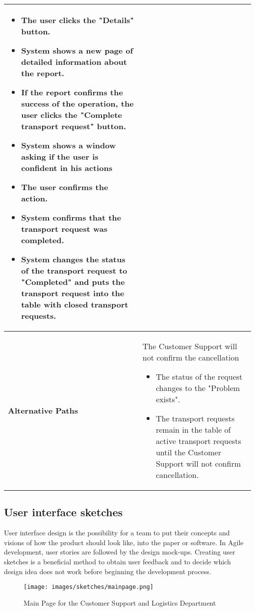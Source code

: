 \documentclass[a4paper]{article}
\begin{document}
\begin{longtable}{|p{}|p{}|}
\begin{itemize}
             \item The user clicks the "Details" button.
             \item System shows a new page of detailed information about the report.
             \item If the report confirms the success of the operation, the user clicks the "Complete transport request" button.
             \item System shows a window asking if the user is confident in his actions
             \item The user confirms the action.
             \item System confirms that the transport request was completed.
             \item System changes the status of the transport request to "Completed" and puts the transport request into the table with closed transport requests.
         \end{itemize} \\
         
      \hline
    \textbf{Alternative Paths} & The Customer Support will not confirm the cancellation
        \begin{itemize}
            \item The status of the request changes to the "Problem exists".
            \item The transport requests remain in the table of active transport requests until the Customer Support will not confirm cancellation.
        \end{itemize} 
        \\
        \hline
    \end{longtable}
    

    \subsection{User interface sketches}
   
    User interface design is the possibility for a team to put their concepts and visions of how the product should look like, into the paper or software. In Agile development, user stories are followed by the design mock-ups. Creating user sketches is a beneficial method to obtain user feedback and to decide which design idea does not work before beginning the development process.
    
     \begin{figure}[H]
     \centering
     \texttt{[image: images/sketches/mainpage.png]}
     \caption{Main Page for the Customer Support and Logistics Department}
     \label{mainPage}
    \end{figure}
    
\end{document}
